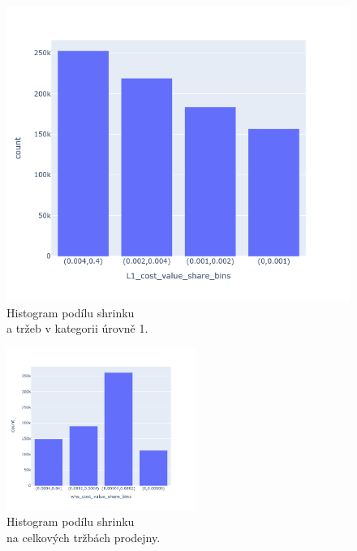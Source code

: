 \begin{figure}[h!]
\begin{minipage}[b]{.55\textwidth}
        \includegraphics[width=\textwidth]{obrazky/grafy/histogram/newplot(3).png}
        \vspace*{-3em}
        \caption{Histogram podílu shrinku \\a tržeb v kategorii úrovně 1.}
        \label{obr:nb:hist4}
    \end{minipage}
\end{figure}

\begin{figure}[h!]
        \centering
        \captionsetup{justification=centering}
        \includegraphics[width=0.55\textwidth]{obrazky/grafy/histogram/newplot(4).png}
        \caption{Histogram podílu shrinku \\na celkových tržbách prodejny.}
        \label{obr:nb:hist5}
\end{figure}



